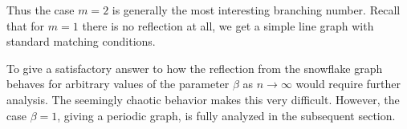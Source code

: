 Thus the case $m=2$ is generally the most interesting branching number. Recall that for $m=1$ there is no reflection at all, we get a simple line graph with standard matching conditions.

To give a satisfactory answer to how the reflection from the snowflake graph behaves for arbitrary values of the parameter $\beta$ as $n\to\infty$ would require further analysis. The seemingly chaotic behavior makes this very difficult. However, the case $\beta = 1$, giving a periodic graph, is fully analyzed in the subsequent section.


